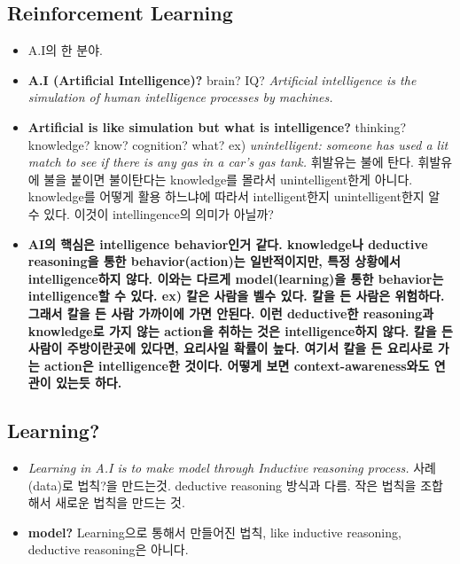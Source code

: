 \documentclass[11pt]{article}
\begin{document}
\subsection{Reinforcement Learning}
\label{sec:org76469cc}
\begin{note}


\begin{itemize}
\item A.I의 한 분야.

\item \textbf{A.I (Artificial Intelligence)?}
brain? IQ?
\emph{Artificial intelligence is the simulation of human intelligence processes by machines.}

\item \textbf{Artificial is like simulation but what is intelligence?}
thinking? knowledge? know? cognition? what?
ex) \emph{unintelligent: someone has used a lit match to see if there is any gas in a car’s gas tank.} 휘발유는  불에 탄다. 휘발유에 불을 붙이면 불이탄다는 knowledge를 몰라서 unintelligent한게 아니다. knowledge를  어떻게 활용 하느냐에 따라서 intelligent한지 unintelligent한지 알 수 있다. 이것이 intellingence의 의미가 아닐까?
\end{itemize}
\end{note}
\begin{important}
\begin{itemize}
\item \textbf{AI의 핵심은 intelligence behavior인거 같다.  knowledge나 deductive reasoning을 통한 behavior(action)는 일반적이지만, 특정 상황에서 intelligence하지 않다. 이와는 다르게  model(learning)을 통한 behavior는  intelligence할 수 있다. ex) 칼은 사람을 벨수 있다. 칼을 든 사람은 위험하다. 그래서 칼을 든 사람 가까이에 가면 안된다. 이런 deductive한 reasoning과 knowledge로 가지 않는 action을 취하는 것은 intelligence하지 않다. 칼을 든사람이 주방이란곳에 있다면, 요리사일 확률이 높다. 여기서 칼을 든 요리사로 가는 action은 intelligence한 것이다. 어떻게 보면 context-awareness와도 연관이 있는듯 하다.}
\end{itemize}
\end{important}

\subsection{Learning?}
\label{sec:orga23d980}
\begin{note}


\begin{itemize}
\item \emph{Learning in A.I is to make model through Inductive reasoning process.}
사례(data)로 법칙?을 만드는것.
deductive reasoning 방식과 다름. 작은 법칙을 조합해서 새로운 법칙을 만드는 것.

\item \textbf{model?} Learning으로 통해서 만들어진 법칙, like inductive reasoning, deductive reasoning은 아니다.
\end{itemize}
\end{note}
\end{document}
